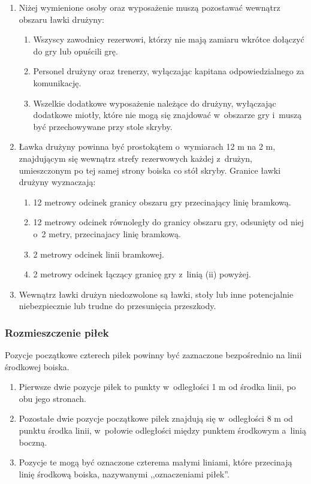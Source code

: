 \documentclass[12pt,a4paper]{article}
\begin{document}
\begin{enumerate}
	\item Niżej wymienione osoby oraz wyposażenie muszą pozostawać wewnątrz
	      obszaru ławki drużyny:

	      \begin{enumerate}
		      \item Wszyscy zawodnicy rezerwowi, którzy nie mają zamiaru wkrótce
		            dołączyć do gry lub opuścili grę.
		      \item Personel drużyny oraz trenerzy, wyłączając kapitana odpowiedzialnego
		            za komunikację.
		      \item Wszelkie dodatkowe wyposażenie należące do drużyny, wyłączając
		            dodatkowe miotły, które nie mogą się znajdować w~obszarze gry i~muszą być przechowywane przy stole skryby.
	      \end{enumerate}

	\item Ławka drużyny powinna być prostokątem o~wymiarach 12 m na 2 m,
	      znajdującym się wewnątrz strefy rezerwowych każdej z~drużyn,
	      umieszczonym po tej samej strony boiska co stół skryby. Granice ławki
	      drużyny wyznaczają:

	      \begin{enumerate}
		      \item 12 metrowy odcinek granicy obszaru gry przecinający linię bramkową.
		      \item 12 metrowy odcinek równoległy do granicy obszaru gry, odsunięty od
		            niej o~2 metry, przecinajacy linię bramkową.
		      \item 2 metrowy odcinek linii bramkowej.
		      \item 2 metrowy odcinek łączący granicę gry z~linią (ii) powyżej.
	      \end{enumerate}

	\item Wewnątrz ławki drużyn niedozwolone są ławki, stoły lub inne
	      potencjalnie niebezpiecznie lub trudne do przesunięcia przeszkody.
\end{enumerate}

\subsubsection{Rozmieszczenie piłek}

Pozycje początkowe czterech piłek powinny być zaznaczone bezpośrednio na
linii środkowej boiska.
\begin{enumerate}
	\item Pierwsze dwie pozycje piłek to punkty w~odległości 1 m od środka
	      linii, po obu jego stronach.

	\item Pozostałe dwie pozycje początkowe piłek znajdują się w~odległości 8 m
	      od punktu środka linii, w~połowie odległości między punktem środkowym a~linią boczną.

	\item Pozycje te mogą być oznaczone czterema małymi liniami, które
	      przecinają linię środkową boiska, nazywanymi ,,oznaczeniami piłek''.
\end{enumerate}
\end{document}
